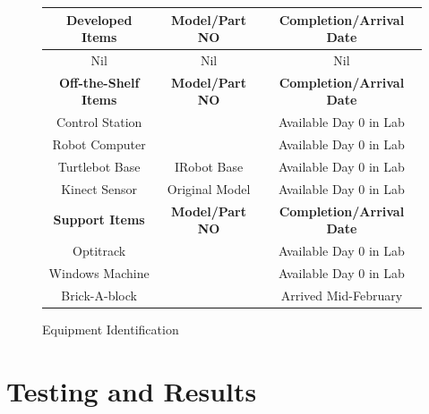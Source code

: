 \documentclass{article}
\begin{document}
\begin{figure}[h!]
\begin{center}
\begin{tabular}{| c | c | c |}
 \hline
 \textbf{Developed Items} & \textbf{Model/Part NO} & \textbf{Completion/Arrival Date} \\ 
 \hline
 Nil & Nil & Nil \\  
 \hline
 \textbf{Off-the-Shelf Items} & \textbf{Model/Part NO} & \textbf{Completion/Arrival Date} \\ 
 \hline
 Control Station &  & Available Day 0 in Lab \\  
 \hline
 Robot Computer &  & Available Day 0 in Lab \\
 \hline
 Turtlebot Base & IRobot Base & Available Day 0 in Lab \\
 \hline
 Kinect Sensor & Original Model & Available Day 0 in Lab \\ 
  \hline
 \textbf{Support Items} & \textbf{Model/Part NO} & \textbf{Completion/Arrival Date} \\ 
 \hline
 Optitrack &  & Available Day 0 in Lab \\  
 \hline
 Windows Machine &  & Available Day 0 in Lab \\
 \hline
 Brick-A-block &  & Arrived Mid-February \\
 \hline
\end{tabular}
\caption{Equipment Identification}
\label{fig:equipment_ID}
\end{center}
\end{figure}

\section{Testing and Results}
\end{document}
